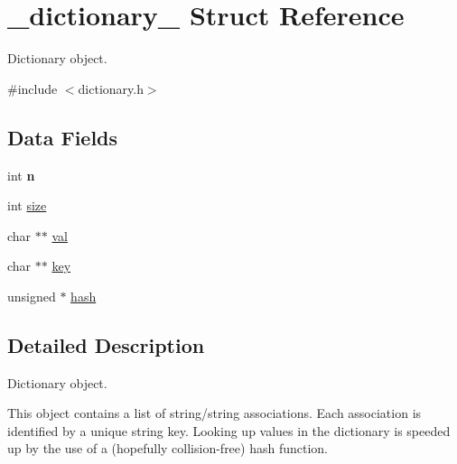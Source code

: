 \hypertarget{struct__dictionary__}{\section{\+\_\+dictionary\+\_\+ Struct Reference}
\label{struct__dictionary__}
}


Dictionary object.  




{\ttfamily \#include $<$dictionary.\+h$>$}

\subsection*{Data Fields}
\begin{DoxyCompactItemize}
\item 
\hypertarget{struct__dictionary___a76f11d9a0a47b94f72c2d0e77fb32240}{int {\bfseries n}}\label{struct__dictionary___a76f11d9a0a47b94f72c2d0e77fb32240}

\item 
int \hyperlink{struct__dictionary___a439227feff9d7f55384e8780cfc2eb82}{size}
\item 
char $\ast$$\ast$ \hyperlink{struct__dictionary___ab972d3fdb3fb429976ac7b7d7c4b8d00}{val}
\item 
char $\ast$$\ast$ \hyperlink{struct__dictionary___aa94bfa291123e0b5a87aa7c325cb0f25}{key}
\item 
unsigned $\ast$ \hyperlink{struct__dictionary___a94cbe0bcb2d50b793bf7898ff983cf6f}{hash}
\end{DoxyCompactItemize}


\subsection{Detailed Description}
Dictionary object. 

This object contains a list of string/string associations. Each association is identified by a unique string key. Looking up values in the dictionary is speeded up by the use of a (hopefully collision-\/free) hash function. 

